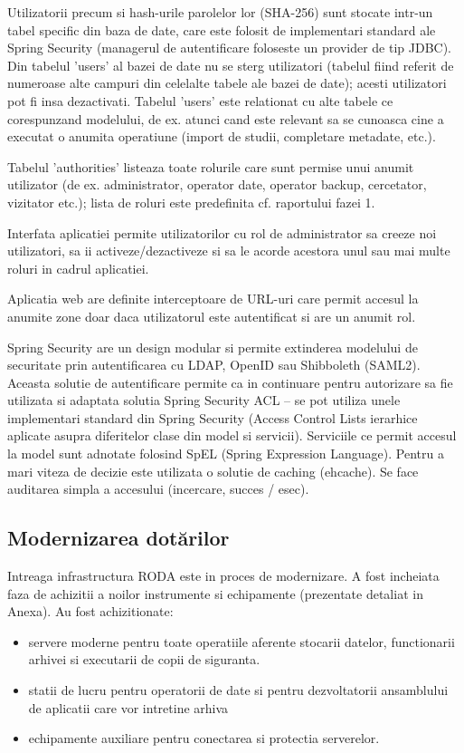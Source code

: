 \documentclass[a4paper, 10pt]{article}
\begin{document}
\medskip

Utilizatorii precum si hash-urile parolelor lor (SHA-256) sunt stocate intr-un tabel specific din baza de date, care este folosit de implementari standard ale Spring Security (managerul de autentificare foloseste un provider de tip JDBC). 
Din tabelul 'users' al bazei de date nu se sterg utilizatori (tabelul fiind referit de numeroase alte campuri din celelalte tabele ale bazei de date); acesti utilizatori pot fi insa dezactivati.
Tabelul 'users' este relationat cu alte tabele ce corespunzand modelului, de ex. atunci cand este relevant sa se cunoasca cine a executat o anumita operatiune (import de studii, completare metadate, etc.).

Tabelul 'authorities' listeaza toate rolurile care sunt permise unui anumit utilizator (de ex. administrator, operator date, operator backup, cercetator, vizitator etc.); lista de roluri este predefinita cf. raportului fazei 1.

\medskip

Interfata aplicatiei permite utilizatorilor cu rol de administrator sa creeze noi utilizatori, sa ii activeze/dezactiveze si sa le acorde acestora unul sau mai multe roluri in cadrul aplicatiei.

Aplicatia web are definite interceptoare de URL-uri care permit accesul la anumite zone doar daca utilizatorul este autentificat si are un anumit rol.

\medskip

Spring Security are un design modular si permite extinderea modelului de securitate prin autentificarea cu LDAP, OpenID sau Shibboleth (SAML2).
Aceasta solutie de autentificare permite ca in continuare pentru autorizare sa fie utilizata si adaptata solutia Spring Security ACL --
se pot utiliza unele implementari standard din Spring Security (Access Control Lists ierarhice aplicate asupra diferitelor clase din model si servicii). 
Serviciile ce permit accesul la model sunt adnotate folosind SpEL
(Spring Expression Language).
Pentru a mari viteza de decizie este utilizata o solutie de caching (ehcache). 
Se face auditarea simpla a accesului (incercare, succes / esec). 

\medskip

\subsection*{Modernizarea dot\u{a}rilor}

\medskip

Intreaga infrastructura RODA este in proces de modernizare. 
A fost incheiata faza de achizitii a noilor instrumente si echipamente (prezentate detaliat in Anexa). Au
fost achizitionate:
\begin{itemize}
\item servere moderne pentru toate operatiile aferente stocarii datelor,
functionarii arhivei si executarii de copii de siguranta.
\item statii de lucru pentru operatorii de date si pentru dezvoltatorii
ansamblului de aplicatii care vor intretine arhiva
\item echipamente auxiliare pentru conectarea si protectia serverelor.
\end{itemize}
\end{document}
